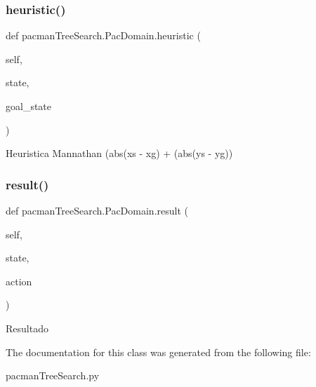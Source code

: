 \subsubsection{\texorpdfstring{heuristic()}{heuristic()}}
{\footnotesize\ttfamily def pacman\+Tree\+Search.\+Pac\+Domain.\+heuristic (\begin{DoxyParamCaption}\item[{}]{self,  }\item[{}]{state,  }\item[{}]{goal\+\_\+state }\end{DoxyParamCaption})}

\begin{DoxyVerb}Heuristica Mannathan (abs(xs - xg) + (abs(ys - yg))\end{DoxyVerb}
 \mbox{\label{classpacman_tree_search_1_1_pac_domain_a168ff25a4290929fd7c8a996bdf6fd9f}} 
\subsubsection{\texorpdfstring{result()}{result()}}
{\footnotesize\ttfamily def pacman\+Tree\+Search.\+Pac\+Domain.\+result (\begin{DoxyParamCaption}\item[{}]{self,  }\item[{}]{state,  }\item[{}]{action }\end{DoxyParamCaption})}

\begin{DoxyVerb}Resultado\end{DoxyVerb}
 

The documentation for this class was generated from the following file\+:\begin{DoxyCompactItemize}
\item 
pacman\+Tree\+Search.\+py\end{DoxyCompactItemize}
